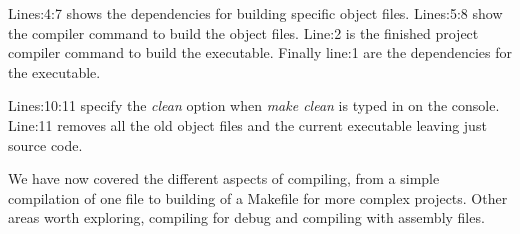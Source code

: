 Lines:4:7 shows the dependencies for building specific object files. Lines:5:8 show the compiler command to build the object files. Line:2 is the finished project compiler command to build the executable. Finally line:1 are the dependencies for the executable.


Lines:10:11 specify the \textit{clean} option when \textit{make clean} is typed in on the console. Line:11 removes all the old object files and the current executable leaving just source code.

We have now covered the different aspects of compiling, from a simple compilation of one file to building of a Makefile for more complex projects. Other areas worth exploring, compiling for debug and compiling with assembly files.



    